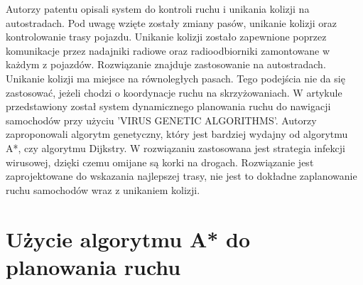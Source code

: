 \newline
\indent
Autorzy patentu \cite{broxmeyer1994vehicle} opisali system do kontroli ruchu i unikania kolizji na autostradach. Pod uwagę wzięte zostały zmiany pasów, unikanie kolizji oraz kontrolowanie trasy pojazdu. Unikanie kolizji zostało zapewnione poprzez komunikacje przez nadajniki radiowe oraz radioodbiorniki zamontowane w każdym z pojazdów. Rozwiązanie znajduje zastosowanie na autostradach. Unikanie kolizji ma miejsce na równoległych pasach. Tego podejścia nie da się zastosować, jeżeli chodzi o koordynacje ruchu na skrzyżowaniach.
\newline
\indent
W artykule \cite{kanoh2007dynamic} przedstawiony został system dynamicznego planowania ruchu do nawigacji samochodów przy użyciu 'VIRUS GENETIC ALGORITHMS'. Autorzy zaproponowali algorytm genetyczny, który jest bardziej wydajny od algorytmu A*, czy algorytmu Dijkstry. W rozwiązaniu zastosowana jest strategia infekcji wirusowej, dzięki czemu omijane są korki na drogach. Rozwiązanie jest zaprojektowane do wskazania najlepszej trasy, nie jest to dokładne zaplanowanie ruchu samochodów wraz z unikaniem kolizji.

\section{Użycie algorytmu A* do planowania ruchu}

